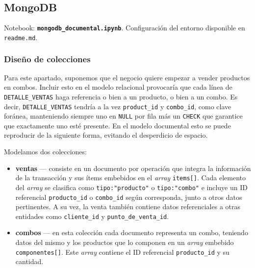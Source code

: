 \documentclass[11pt,a4paper]{article}
\begin{document}
\subsection{MongoDB}

Notebook: \textbf{\texttt{mongodb\_documental.ipynb}}. Configuración del entorno disponible
en \texttt{readme.md}.

\subsubsection{Diseño de colecciones}

Para este apartado, suponemos que el negocio quiere empezar a vender productos en combos.
Incluir esto en el modelo relacional provocaría que cada línea de \texttt{DETALLE\_VENTAS}
haga referencia o bien a un producto, o bien a un combo. Es decir, \texttt{DETALLE\_VENTAS}
tendría a la vez \texttt{product\_id} y \texttt{combo\_id}, como clave foránea, manteniendo
siempre uno en \texttt{NULL} por fila más un \texttt{CHECK} que garantice que exactamente
uno esté presente. En el modelo documental esto se puede reproducir de la siguiente forma,
evitando el desperdicio de espacio.

Modelamos dos colecciones:

\begin{itemize}[leftmargin=*]
    \item \textbf{ventas} — consiste en un documento por operación que integra la
    información de la transacción y sus ítems embebidos en el \textit{array}
    \texttt{items[]}. Cada elemento del \textit{array} se clasifica como
    \texttt{tipo:"producto"} o \texttt{tipo:"combo"} e incluye un ID referencial
    \texttt{producto\_id} o \texttt{combo\_id} según corresponda, junto a otros datos
    pertinentes. A su vez, la venta también contiene datos referenciales a otras entidades
    como \texttt{cliente\_id} y \texttt{punto\_de\_venta\_id}.
    \item \textbf{combos} — en esta colección cada documento representa un combo, teniendo
    datos del mismo y los productos que lo componen en un \textit{array} embebido
    \texttt{componentes[]}. Este \textit{array} contiene el ID referencial
    \texttt{producto\_id} y su cantidad.
\end{itemize}
\end{document}
